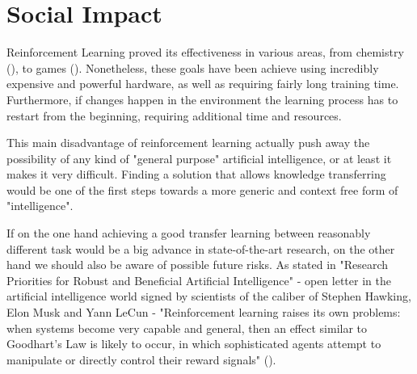 \section{Social Impact}

Reinforcement Learning proved its effectiveness in various areas, from chemistry (\cite{zhou2017optimizing}), to games (\cite{silver2017mastering}). Nonetheless, these goals have been achieve using incredibly expensive and powerful hardware, as well as requiring fairly long training time. Furthermore, if changes happen in the environment the learning process has to restart from the beginning, requiring additional time and resources. 

This main disadvantage of reinforcement learning actually push away the possibility of any kind of "general purpose" artificial intelligence, or at least it makes it very difficult. Finding a solution that allows knowledge transferring would be one of the first steps towards a more generic and context free form of "intelligence". 

If on the one hand achieving a good transfer learning between reasonably different task would be a big advance in state-of-the-art research, on the other hand we should also be aware of possible future risks. As stated in "Research Priorities for Robust and Beneficial Artificial Intelligence" - open letter in the artificial intelligence world signed by scientists of the caliber of Stephen Hawking, Elon Musk and Yann LeCun - "Reinforcement learning raises its own problems: when systems become very capable and general, then an effect similar to Goodhart’s Law is likely to occur, in which sophisticated agents attempt to manipulate or directly control their reward signals" (\cite{russell2016research}). %
